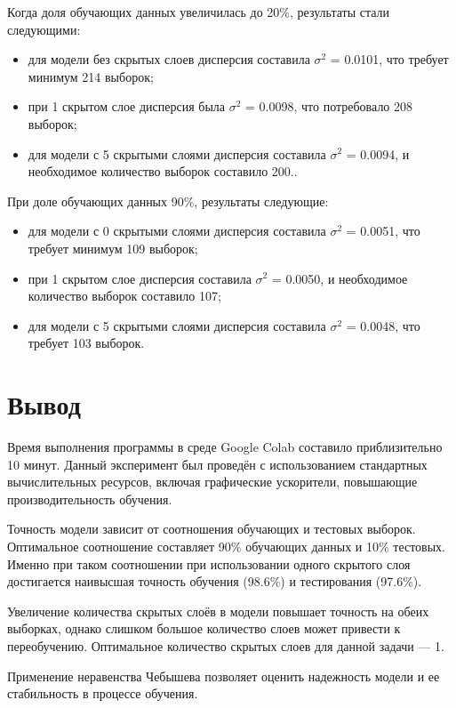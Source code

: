 Когда доля обучающих данных увеличилась до 20\%, результаты стали следующими:
\begin{itemize}[label*=---]
	\item для модели без скрытых слоев дисперсия составила $\sigma^2$ = 0.0101, что требует минимум 214 выборок;
	\item при 1 скрытом слое дисперсия была $\sigma^2$ = 0.0098, что потребовало 208 выборок;
	\item для модели с 5 скрытыми слоями дисперсия составила $\sigma^2$ = 0.0094, и необходимое количество выборок составило 200..
\end{itemize}

При доле обучающих данных 90\%, результаты следующие:
\begin{itemize}[label*=---]
	\item для модели с 0 скрытыми слоями дисперсия составила $\sigma^2$ = 0.0051, что требует минимум 109 выборок;
	\item при 1 скрытом слое дисперсия составила $\sigma^2$ = 0.0050, и необходимое количество выборок составило 107;
	\item для модели с 5 скрытыми слоями дисперсия составила $\sigma^2$ = 0.0048, что требует 103 выборок.
\end{itemize}

\section*{Вывод}

Время выполнения программы в среде Google Colab составило приблизительно 10 минут. Данный эксперимент был проведён с использованием стандартных вычислительных ресурсов, включая графические ускорители, повышающие производительность обучения.

Точность модели зависит от соотношения обучающих и тестовых выборок. Оптимальное соотношение составляет 90\% обучающих данных и 10\% тестовых. Именно при таком соотношении при использовании одного скрытого слоя достигается наивысшая точность обучения (98.6\%) и тестирования (97.6\%).

Увеличение количества скрытых слоёв в модели повышает точность на обеих выборках, однако слишком большое количество слоев может привести к переобучению. Оптимальное количество скрытых слоев для данной задачи --- 1.

Применение неравенства Чебышева позволяет оценить надежность модели и ее стабильность в процессе обучения.

\clearpage
